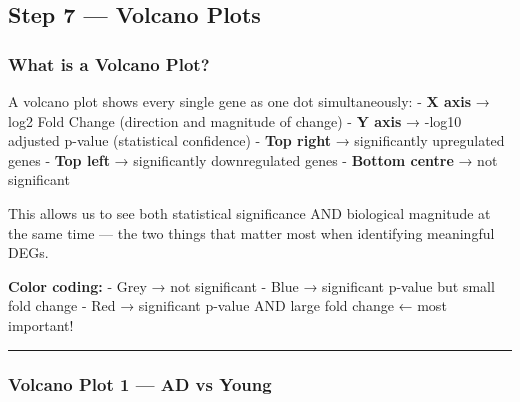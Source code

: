 \documentclass[
]{article}
\begin{document}
\subsection{Step 7 --- Volcano Plots}\label{step-7-volcano-plots}

\subsubsection{What is a Volcano Plot?}\label{what-is-a-volcano-plot}

A volcano plot shows every single gene as one dot simultaneously: -
\textbf{X axis} → log2 Fold Change (direction and magnitude of change) -
\textbf{Y axis} → -log10 adjusted p-value (statistical confidence) -
\textbf{Top right} → significantly upregulated genes - \textbf{Top left}
→ significantly downregulated genes - \textbf{Bottom centre} → not
significant

This allows us to see both statistical significance AND biological
magnitude at the same time --- the two things that matter most when
identifying meaningful DEGs.

\textbf{Color coding:} - Grey → not significant - Blue → significant
p-value but small fold change - Red → significant p-value AND large fold
change ← most important!

\begin{center}\rule{0.5\linewidth}{0.5pt}\end{center}

\subsubsection{Volcano Plot 1 --- AD vs
Young}\label{volcano-plot-1-ad-vs-young}
\end{document}
